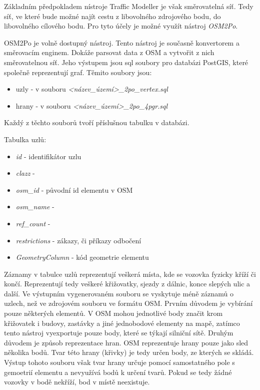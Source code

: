 Základním předpokladem nístroje Traffic Modeller je však směrovatelná síť. Tedy síť, ve které bude možné najít cestu z libovolného zdrojového bodu, do libovolného cílového bodu. Pro tyto účely je možné využít nástroj \textit{OSM2Po}. 

OSM2Po je volně dostupný nástroj. Tento nástroj je současně konvertorem a směrovacím enginem. Dokáže parsovat data z OSM a vytvořit z nich směrovatelnou síť. Jeho výstupem jsou sql soubory pro databázi PostGIS, které společně reprezentují graf. Těmito soubory jsou: 

\begin{itemize}
  \item uzly - v souboru \textit{<název\_území>\_2po\_vertex.sql} 
  \item hrany - v souboru \textit{<název\_území>\_2po\_4pgr.sql} 
\end{itemize} 

Každý z těchto souborů tvoří příslušnou tabulku v databázi.

Tabulka uzlů:
\begin{itemize}
  \item \textit{id} - identifikátor uzlu
  \item \textit{clazz} - 
  \item \textit{osm\_id} - původní id elementu v OSM
  \item \textit{osm\_name} - 
  \item \textit{ref\_count} - 
  \item \textit{restrictions} - zákazy, či příkazy odbočení
  \item \textit{GeometryColumn} - kód geometrie elementu
\end{itemize}

Záznamy v tabulce uzlů reprezentují veškerá místa, kde se vozovka fyzicky kříží či končí. Reprezentují tedy veškeré křižovatky, sjezdy z dálnic, konce slepých ulic a další. Ve výstupním vygenerovaném souboru se vyskytuje méně záznamů o uzlech, než ve zdrojovém souboru ve formátu OSM. Prvním důvodem je vybírání pouze některých elementů. V OSM mohou jednotlivé body značit krom křižovatek i budovy, zastávky a jiné jednobodové elementy na mapě, zatímco tento nástroj vyexportuje pouze body, které se týkají silniční sítě. Druhým důvodem je způsob reprezentace hran. OSM reprezentuje hrany pouze jako sled několika bodů. Tvar této hrany (křivky) je tedy určen body, ze kterých se skládá. Výstup tohoto souboru však tvar hrany určuje pomocí samostatného pole s gemoetrií elementu a nevyužívá bodů k určení tvarů. Pokud se tedy žádné vozovky v bodě nekříží, bod v místě neexistuje. 

